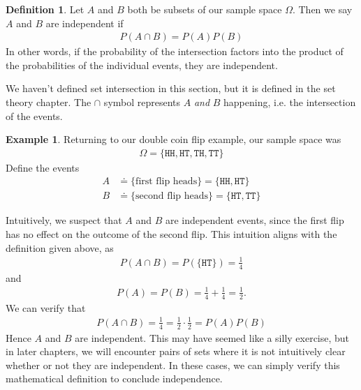 \documentclass{tufte-book}
\newcommand\hd{\texttt{H}}
\newcommand\tl{\texttt{T}}
\theoremstyle{definition}
\numberwithin{theorem}{section}
\newtheorem{definition}[theorem]{Definition}
\numberwithin{definition}{section}
\numberwithin{lemma}{section}
\numberwithin{corollary}{section}
\numberwithin{proposition}{section}
\numberwithin{remark}{section}
\numberwithin{claim}{section}
\numberwithin{observation}{section}
\numberwithin{fact}{section}
\numberwithin{assumption}{section}
\newtheorem{example}[theorem]{Example}
\numberwithin{example}{section}
\numberwithin{exercise}{section}
\begin{document}
\begin{definition}
Let $A$ and $B$ both be subsets of our sample space $\Omega$. Then we say $A$ and $B$ are independent if
\begin{align*}
P(A \cap B) = P(A) P(B)
\end{align*}
In other words, if the probability of the intersection factors into the product of the probabilities of the individual events, they are independent.
\end{definition}
We haven't defined set intersection in this section, but it is defined in the set theory chapter. The $\cap$ symbol represents $A$ \textit{and} $B$ happening, i.e. the intersection of the events.

\begin{example}
Returning to our double coin flip example, our sample space was
\begin{align*}
\Omega = \{\hd \hd, \hd \tl, \tl \hd, \tl \tl\}
\end{align*}
Define the events 
\begin{align*}
A &\doteq \{\text{first flip heads}\} = \{\hd \hd, \hd \tl\} \\
B &\doteq \{\text{second flip heads}\} = \{\hd \tl, \tl \tl\}
\end{align*}


Intuitively, we suspect that $A$ and $B$ are independent events, since the first flip has no effect on the outcome of the second flip. This intuition aligns with the definition given above, as
\begin{align*}
P(A \cap B) = P(\{\hd \tl\}) = \frac{1}{4}
\end{align*}
and
\begin{align*}
P(A) = P(B) = \frac{1}{4} + \frac{1}{4} = \frac{1}{2}.
\end{align*}
We can verify that
\begin{align*}
P(A \cap B) = \frac{1}{4} = \frac{1}{2} \cdot \frac{1}{2} = P(A) P(B)
\end{align*}
Hence $A$ and $B$ are independent. This may have seemed like a silly exercise, but in later chapters, we will encounter pairs of sets where it is not intuitively clear whether or not they are independent. In these cases, we can simply verify this mathematical definition to conclude independence.

\end{example}
\end{document}
